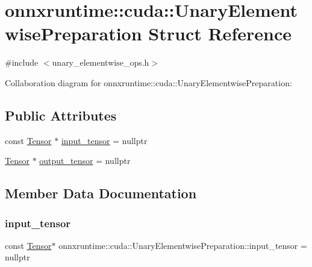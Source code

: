 \hypertarget{structonnxruntime_1_1cuda_1_1UnaryElementwisePreparation}{}\section{onnxruntime\+:\+:cuda\+:\+:Unary\+Elementwise\+Preparation Struct Reference}
\label{structonnxruntime_1_1cuda_1_1UnaryElementwisePreparation}


{\ttfamily \#include $<$unary\+\_\+elementwise\+\_\+ops.\+h$>$}



Collaboration diagram for onnxruntime\+:\+:cuda\+:\+:Unary\+Elementwise\+Preparation\+:
\subsection*{Public Attributes}
\begin{DoxyCompactItemize}
\item 
const \mbox{\hyperlink{classonnxruntime_1_1Tensor}{Tensor}} $\ast$ \mbox{\hyperlink{structonnxruntime_1_1cuda_1_1UnaryElementwisePreparation_aeb6a4415d1a9e345a0888886ee8bb690}{input\+\_\+tensor}} = nullptr
\item 
\mbox{\hyperlink{classonnxruntime_1_1Tensor}{Tensor}} $\ast$ \mbox{\hyperlink{structonnxruntime_1_1cuda_1_1UnaryElementwisePreparation_aa1ff1e66eebf4792062fbb9990d2df2e}{output\+\_\+tensor}} = nullptr
\end{DoxyCompactItemize}


\subsection{Member Data Documentation}
\mbox{\label{structonnxruntime_1_1cuda_1_1UnaryElementwisePreparation_aeb6a4415d1a9e345a0888886ee8bb690}} 
\subsubsection{\texorpdfstring{input\+\_\+tensor}{input\_tensor}}
{\footnotesize\ttfamily const \mbox{\hyperlink{classonnxruntime_1_1Tensor}{Tensor}}$\ast$ onnxruntime\+::cuda\+::\+Unary\+Elementwise\+Preparation\+::input\+\_\+tensor = nullptr}

